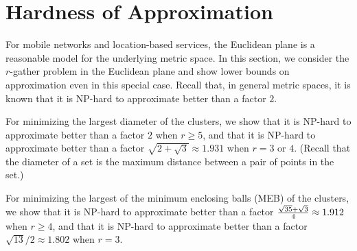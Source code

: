 
\section{Hardness of Approximation}


For mobile networks and location-based services, the Euclidean plane is a reasonable model for the underlying metric space. In this section, we consider the $r$-gather problem in the Euclidean plane and show lower bounds on approximation even in this special case.  Recall that, in general metric spaces, it is known that it is NP-hard to approximate better than a factor $2$. 

For minimizing the largest diameter of the clusters, we show that it is NP-hard to approximate better than a factor $2$ when $r\geq5$, and that it is NP-hard to approximate better than a factor $\sqrt{2+\sqrt{3}} \approx 1.931$ when $r=3$ or $4$.  (Recall that the diameter of a set is the maximum distance between a pair of points in the set.)

For minimizing the largest of the minimum enclosing balls (MEB) of the clusters, we show that it is NP-hard to approximate better than a factor ${\sqrt{35}+\sqrt{3} \over 4} \approx 1.912$ when $r \geq 4$, and that it is NP-hard to approximate better than a factor $\sqrt{13}/2 \approx 1.802$ when $r=3$.




